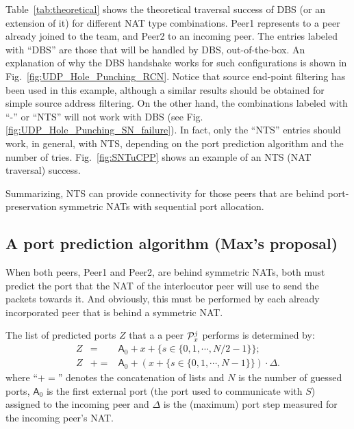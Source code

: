 Table~\ref{tab:theoretical} shows the theoretical traversal success of
DBS (or an extension of it) for different NAT type combinations. Peer1
represents to a peer already joined to the team, and Peer2 to an
incoming peer. The entries labeled with ``DBS'' are those that will be
handled by DBS, out-of-the-box. An explanation of why the DBS
handshake works for such configurations is shown in
Fig.~\ref{fig:UDP_Hole_Punching_RCN}.  Notice that source end-point
filtering has been used in this example, although a similar results
should be obtained for simple source address filtering. On the other
hand, the combinations labeled with ``-'' or ``NTS'' will not work
with DBS (see Fig.\ref{fig:UDP_Hole_Punching_SN_failure}). In fact,
only the ``NTS'' entries should work, in general, with NTS, depending
on the port prediction algorithm and the number of
tries. Fig.~\ref{fig:SNTuCPP} shows an example of an NTS (NAT
traversal) success.

Summarizing, NTS can provide connectivity for those peers that are
behind port-preservation symmetric NATs with sequential port
allocation.

\subsection{A port prediction algorithm (Max's proposal)}
When both peers, Peer1 and Peer2, are behind symmetric NATs, both must
predict the port that the NAT of the interlocutor peer will use to
send the packets towards it. And obviously, this must be performed by
each already incorporated peer that is behind a symmetric NAT.

The list of predicted ports $Z$ that a a peer ${\cal P}^j_x$ performs
is determined by:
\begin{equation}
  \begin{array}{rcl}
    Z & = & \textsf{A}_0 + x + \{s\in\{0,1,\cdots,N/2-1\}\}; \\
    Z & += & \textsf{A}_0 + (x + \{s\in\{0,1,\cdots, N-1\}\}) \cdot \Delta.
  \end{array}
\end{equation}
where ``$+=$'' denotes the concatenation of lists and $N$ is the
number of guessed ports, $\textsf{A}_0$ is the first external port (the
port used to communicate with $S$) assigned to the incoming peer and
$\Delta$ is the (maximum) port step measured for the incoming peer's
NAT.
